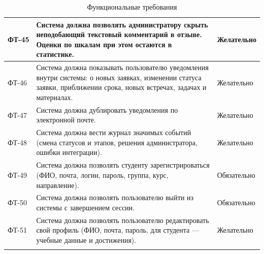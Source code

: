 \documentclass[a4paper,12pt]{article}
\begin{document}
{\begin{longtable}{|p{1.3cm}|p{11.1cm}|p{2.3cm}|}
ФТ-45 & Система должна позволять администратору скрыть неподобающий текстовый комментарий в отзыве. Оценки по шкалам при этом остаются в статистике. & Желательно\\ \hline
ФТ-46 & Система должна показывать пользователю уведомления внутри системы: о новых заявках, изменении статуса заявки, приближении срока, новых встречах, задачах и материалах. & Желательно\\ \hline
ФТ-47 & Система должна дублировать уведомления по электронной почте. & Желательно\\ \hline
ФТ-48 & Система должна вести журнал значимых событий (смена статусов и этапов, решения администратора, ошибки интеграции). & Желательно\\ \hline
ФТ-49 & Система должна позволять студенту зарегистрироваться (ФИО, почта, логин, пароль, группа, курс, направление). & Обязательно\\ \hline
ФТ-50 & Система должна позволять пользователю выйти из системы с завершением сессии. & Обязательно\\ \hline
ФТ-51 & Система должна позволять пользователю редактировать свой профиль (ФИО, почта, пароль, для студента — учебные данные и достижения). & Желательно\\ \hline
\caption{Функциональные требования}
\end{longtable}}
\end{document}

